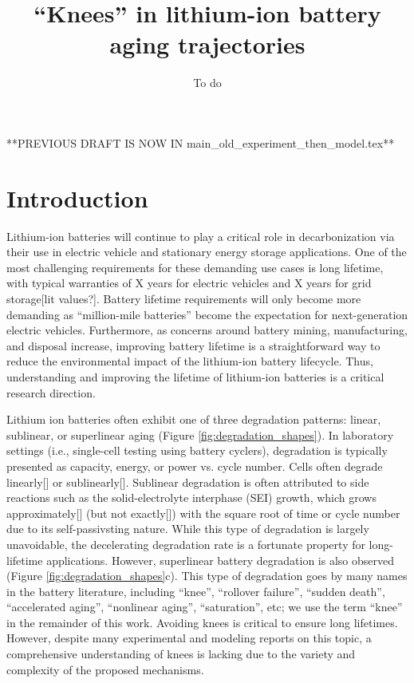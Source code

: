\documentclass{article}
\title{``Knees'' in lithium-ion battery aging trajectories}
\author{To do}
\date{}
\begin{document}
\maketitle

**PREVIOUS DRAFT IS NOW IN main\_old\_experiment\_then\_model.tex**

\section{Introduction}

Lithium-ion batteries will continue to play a critical role in decarbonization via their use in electric vehicle and stationary energy storage applications. One of the most challenging requirements for these demanding use cases is long lifetime, with typical warranties of X years for electric vehicles and X years for grid storage[lit values?]. Battery lifetime requirements will only become more demanding as “million-mile batteries” become the expectation for next-generation electric vehicles. Furthermore, as concerns around battery mining, manufacturing, and disposal increase, improving battery lifetime is a straightforward way to reduce the environmental impact of the lithium-ion battery lifecycle. Thus, understanding and improving the lifetime of lithium-ion batteries is a critical research direction.

Lithium ion batteries often exhibit one of three degradation patterns: linear, sublinear, or superlinear aging (Figure \ref{fig:degradation_shapes}). In laboratory settings (i.e., single-cell testing using battery cyclers), degradation is typically presented as capacity, energy, or power vs. cycle number. Cells often degrade linearly[] or sublinearly[]. Sublinear degradation is often attributed to side reactions such as the solid-electrolyte interphase (SEI) growth, which grows approximately[] (but not exactly[]) with the square root of time or cycle number due to its self-passivsting nature. While this type of degradation is largely unavoidable, the decelerating degradation rate is a fortunate property for long-lifetime applications. However, superlinear battery degradation is also observed (Figure \ref{fig:degradation_shapes}c). This type of degradation goes by many names in the battery literature, including ``knee'', ``rollover failure'', ``sudden death'', ``accelerated aging'', ``nonlinear aging'', ``saturation'', etc; we use the term ``knee'' in the remainder of this work. Avoiding knees is critical to ensure long lifetimes. However, despite many experimental and modeling reports on this topic, a comprehensive understanding of knees is lacking due to the variety and complexity of the proposed mechanisms.
\end{document}
